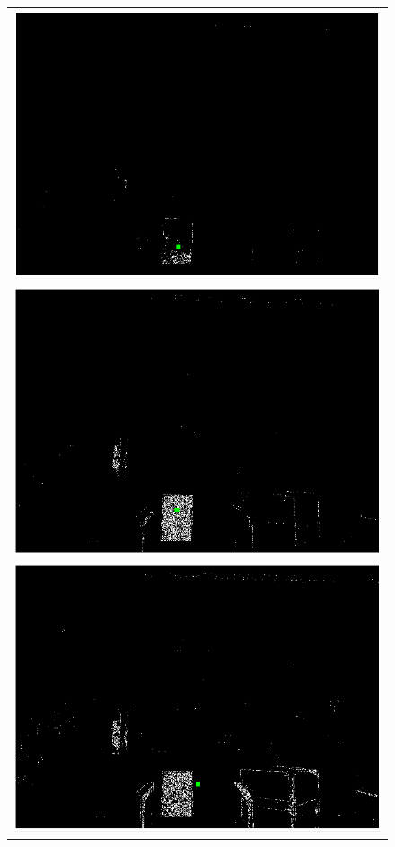 \begin{figure}
\centering
  \begin{tabular}{ c }
    \includegraphics[scale=0.25]{zscreenshots/hsl_green_20}\\ 
    \includegraphics[scale=0.25]{zscreenshots/hsl_green_30}\\ 
    \includegraphics[scale=0.25]{zscreenshots/hsl_green_40}\\ 

\end{tabular}
\end{figure}
